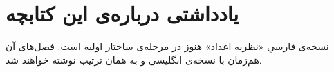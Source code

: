 \chapter*{یادداشتی درباره‌ی این کتابچه}

نسخه‌ی فارسیِ «نظریه اعداد» هنوز در مرحله‌ی ساختار اولیه است. فصل‌های آن هم‌زمان با نسخه‌ی انگلیسی و به همان ترتیب نوشته خواهند شد.
